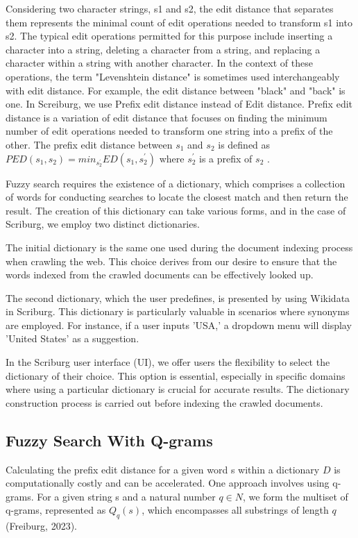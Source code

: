 Considering two character strings, s1 and s2, the edit distance that separates them represents the minimal count of edit operations needed to transform s1 into s2. The typical edit operations permitted for this purpose include inserting a character into a string, deleting a character from a string, and replacing a character within a string with another character. In the context of these operations, the term "Levenshtein distance" is sometimes used interchangeably with edit distance. For example, the edit distance between "black" and "back" is one. In Screiburg, we use Prefix edit distance instead of Edit distance.  Prefix edit distance is a variation of edit distance that focuses on finding the minimum number of edit operations needed to transform one string into a prefix of the other. The prefix edit distance between $s_1$ and $s_2$ is defined as $PED(s_1, s_2) = min_{s_2^{'}} ED(s_1, s_2^{'})$ where $s_2^{'}$ is a prefix of $s_2$ \cite{freiburg2023ir}.


Fuzzy search requires the existence of a dictionary, which comprises a collection of words for conducting searches to locate the closest match and then return the result. The creation of this dictionary can take various forms, and in the case of Scriburg, we employ two distinct dictionaries.

The initial dictionary is the same one used during the document indexing process when crawling the web. This choice derives from our desire to ensure that the words indexed from the crawled documents can be effectively looked up.

The second dictionary, which the user predefines, is presented by using Wikidata in Scriburg. This dictionary is particularly valuable in scenarios where synonyms are employed. For instance, if a user inputs 'USA,' a dropdown menu will display 'United States' as a suggestion.

In the Scriburg user interface (UI), we offer users the flexibility to select the dictionary of their choice. This option is essential, especially in specific domains where using a particular dictionary is crucial for accurate results. The dictionary construction process is carried out before indexing the crawled documents.

\subsection{Fuzzy Search With Q-grams}
Calculating the prefix edit distance for a given word s within a dictionary $D$ is computationally costly and can be accelerated. One approach involves using q-grams. For a given string s and a natural number $q \in N$,  we form the multiset of q-grams, represented as $Q_q(s)$, which encompasses all substrings of length $q$ (Freiburg, 2023).


